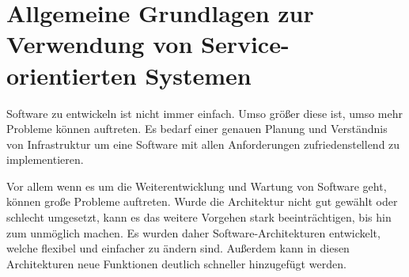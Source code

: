 \chapter[Allgemeine Grundlagen]{Allgemeine Grundlagen zur Verwendung von Service-orientierten Systemen}
\label{chap:grundlagen}
Software zu entwickeln ist nicht immer einfach. Umso größer diese ist, umso mehr Probleme können auftreten. Es bedarf einer genauen Planung und Verständnis von Infrastruktur um eine Software mit allen Anforderungen zufriedenstellend zu implementieren. 

Vor allem wenn es um die Weiterentwicklung und Wartung von Software geht, können große Probleme auftreten. Wurde die Architektur nicht gut gewählt oder schlecht umgesetzt, kann es das weitere Vorgehen stark beeinträchtigen, bis hin zum unmöglich machen. Es wurden daher Software-Architekturen entwickelt, welche flexibel und einfacher zu ändern sind. Außerdem kann in diesen Architekturen neue Funktionen deutlich schneller hinzugefügt werden.

